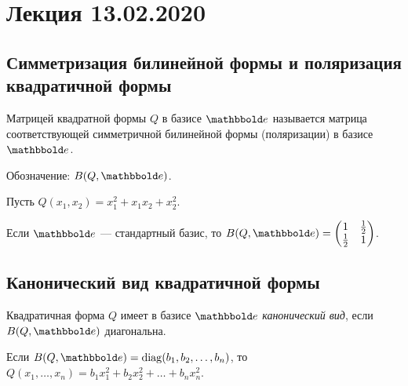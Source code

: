 \section{Лекция 13.02.2020}

\subsection{Симметризация билинейной формы и поляризация квадратичной формы}

\begin{definition}
    Матрицей квадратной формы $Q$ в базисе $\E$ называется матрица соответствующей симметричной билинейной формы (поляризации) в базисе $\E$.

    Обозначение: $B(Q, \E)$.
\end{definition}

\begin{example}
    Пусть $Q(x_1, x_2) = x_1^2 + x_1 x_2 + x_2^2$.

    Если $\E$ --- стандартный базис, то $B(Q, \E) = \begin{pmatrix} 1 & \frac{1}{2} \\ \frac{1}{2} & 1 \end{pmatrix}$.
\end{example}


\subsection{Канонический вид квадратичной формы}

\begin{definition}
    Квадратичная форма $Q$ имеет в базисе $\E$ \textit{канонический вид}, если $B(Q, \E)$ диагональна.

    Если $B(Q, \E) = \diag(b_1, b_2, \dots, b_n)$, то $Q(x_1, \dots, x_n) = b_1 x_1^2 + b_2 x_2^2 + \dots + b_n x_n^2$.
\end{definition}


